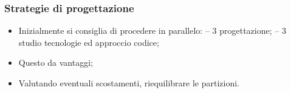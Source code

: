     \subsubsection{Strategie di progettazione}
        \begin{itemize}
            \item Inizialmente si consiglia di procedere in parallelo:
                \subitem -- 3 progettazione;
                \subitem -- 3 studio tecnologie ed approccio codice;
            \item Questo da vantaggi;
            \item Valutando eventuali scostamenti, riequilibrare le partizioni.
        \end{itemize}








